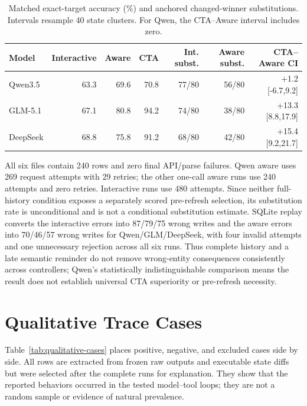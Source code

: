 \documentclass[10pt]{article}
\begin{document}
\begin{table}[h]
\centering
\scriptsize
\setlength{\tabcolsep}{3pt}
\begin{tabular}{lrrrrrr}
\toprule
Model & Interactive & Aware & CTA & Int. subst. & Aware subst. & CTA--Aware CI \\
\midrule
Qwen3.5 & 63.3 & 69.6 & 70.8 & 77/80 & 56/80 & +1.2 [-6.7,9.2] \\
GLM-5.1 & 67.1 & 80.8 & 94.2 & 74/80 & 38/80 & +13.3 [8.8,17.9] \\
DeepSeek & 68.8 & 75.8 & 91.2 & 68/80 & 42/80 & +15.4 [9.2,21.7] \\
\bottomrule
\end{tabular}
\caption{Matched \NewSchemaReplication{} exact-target accuracy (\%) and anchored changed-winner substitutions.
Intervals resample 40 state clusters. For Qwen, the CTA--Aware interval includes zero.}
\end{table}

All six files contain 240 rows and zero final API/parse failures. Qwen aware uses 269 request
attempts with 29 retries; the other one-call aware runs use 240 attempts and zero retries.
Interactive runs use 480 attempts. Since neither full-history condition exposes a separately
scored pre-refresh selection, its substitution rate is unconditional and is not a conditional
substitution estimate.
SQLite replay converts the interactive errors into 87/79/75 wrong writes and the aware errors
into 70/46/57 wrong writes for Qwen/GLM/DeepSeek, with four invalid attempts and one unnecessary
rejection across all six runs. Thus complete history and a late semantic reminder do not remove
wrong-entity consequences consistently across controllers; Qwen's statistically indistinguishable
comparison means the result does not
establish universal CTA superiority or pre-refresh necessity.

\section{Qualitative Trace Cases}
Table~\ref{tab:qualitative-cases} places positive, negative, and excluded cases side by side.
All rows are extracted from frozen raw outputs and executable state diffs but were selected after
the complete runs for explanation. They show that the reported behaviors occurred in the
tested model--tool loops; they are not a random sample or evidence of natural prevalence.
\end{document}
